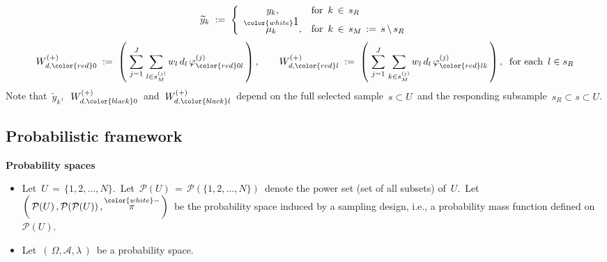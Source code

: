 \begin{equation*}
\widetilde{y}_{k}
\; := \;
    \left\{\begin{array}{cl}
        y_{k}, & \textnormal{for \,$k \,\in\, s_{R}$}
        \\
        \overset{{\color{white}\textnormal{\large1}}}{\mu_{k}}, & \textnormal{for \,$k \,\in\, s_{M} \,:=\, s \,\backslash\, s_{R}$}
        \end{array}\right.
\end{equation*}
\begin{equation*}
W^{(+)}_{d,{\color{red}0}}
\; := \;
    \left(\;
        \overset{J}{\underset{j=1}{\sum}}\;
        \underset{l \in s_{M}^{(j)}}{\sum}\,w_{l}\,d_{l}\,\varphi^{(j)}_{{\color{red}0}l}
        \,\right),
\quad\quad
W^{(+)}_{d,{\color{red}l}}
\; := \;
    \left(\;
        \overset{J}{\underset{j=1}{\sum}}\;
        \underset{k \in s_{M}^{(j)}}{\sum}\,w_{l}\,d_{l}\,\varphi^{(j)}_{{\color{red}l}k}
        \,\right),
\;\;
\textnormal{for each \,$l \in s_{R}$}
\end{equation*}
\vskip 0.2cm
\noindent
Note that
\,$\widetilde{y}_{k}$,\,
\,$W^{(+)}_{d,{\color{black}0}}$\,
and
\,$W^{(+)}_{d,{\color{black}l}}$\,
depend on the full selected sample
\,$s \subset U$\,
and the responding subsample
\,$s_{R} \subset s \subset U$.\,


\vskip 1.0cm
\subsection{Probabilistic framework}
\label{DomainRatioProbabilisticFramework}
\setcounter{theorem}{0}


\noindent
\textbf{Probability spaces}
\begin{itemize}
\item
    Let
    \,$U \,=\, \{1,2,\ldots,N\}$.\,
    Let
    \,$\mathcal{P}(U) \,=\, \mathcal{P}(\{1,2,\ldots,N\})$\,
    denote the power set (set of all subsets) of \,$U$.\,
    Let
    \,$\left(\,\mathcal{P}(U)\,,\mathcal{P}(\mathcal{P}(U))\,,\overset{{\color{white}-}}{\pi}\,\right)$\,
    be the probability space induced by a sampling design, i.e.,
    a probability mass function defined on
    \,$\mathcal{P}(U)$.\,
\item
    Let \,$\left(\,\Omega,\mathscr{A},\lambda\,\right)$\, be a probability space.
\end{itemize}

